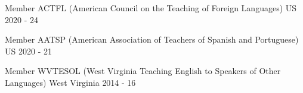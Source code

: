 


\begin{cvhonors}


\cvhonor
{Member} %
{ACTFL (American Council on the Teaching of Foreign Languages)} %
{US} %
{2020 - 24} %


\cvhonor
{Member} %
{AATSP (American Association of Teachers of Spanish and Portuguese)} %
{US} %
{2020 - 21} %


\cvhonor
{Member} %
{WVTESOL (West Virginia Teaching English to Speakers of Other Languages)} %
{West Virginia} %
{2014 - 16} %


\end{cvhonors}